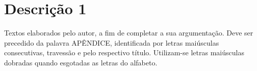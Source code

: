 \chapter{Descrição 1}

Textos elaborados pelo autor, a fim de completar a sua argumentação. Deve ser precedido da palavra APÊNDICE, identificada por letras maiúsculas consecutivas, travessão e pelo respectivo título. Utilizam-se letras maiúsculas dobradas quando esgotadas as letras do alfabeto. 
